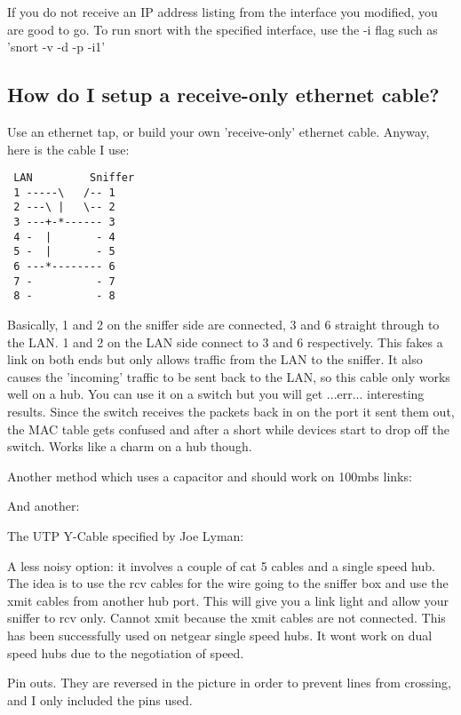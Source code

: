 \documentclass{article}
\begin{document}
If you do not receive an IP address listing from the interface you
modified, you are good to go.  To run snort with the specified interface,
use the -i flag such as 'snort -v -d -p -i1'
 
\subsection{How do I setup a receive-only ethernet cable?}

Use an ethernet tap, or build your own 'receive-only' ethernet cable.
Anyway, here is the cable I use: 

\begin{verbatim}
 LAN         Sniffer 
 1 -----\   /-- 1
 2 ---\ |   \-- 2
 3 ---+-*------ 3
 4 -  |       - 4
 5 -  |       - 5
 6 ---*-------- 6
 7 -          - 7
 8 -          - 8
\end{verbatim}

Basically, 1 and 2 on the sniffer side are connected, 3 and 6 
straight through to the LAN. 1 and 2 on the LAN side connect to 3 and 
6 respectively. This fakes a link on both ends but only allows 
traffic from the LAN to the sniffer. It also causes the 'incoming' 
traffic to be sent back to the LAN, so this cable only works well on 
a hub. You can use it on a switch but you will get ...err... 
interesting results. Since the switch receives the packets back in on 
the port it sent them out, the MAC table gets confused and after a 
short while devices start to drop off the switch. Works like a charm 
on a hub though. 

Another method which uses a capacitor and should work on 100mbs links:


And another:

    The UTP Y-Cable specified by Joe Lyman:

A less noisy option: it involves a couple of cat 5 cables and a single speed
hub. The idea is to use the rcv cables for the wire going to the sniffer box
and use the xmit cables from another hub port. This will give you a link light
and allow your sniffer to rcv only. Cannot xmit because the xmit cables are not
connected. This has been successfully used on netgear single speed hubs. It
wont work on dual speed hubs due to the negotiation of speed.

Pin outs. They are reversed in the picture in order to prevent lines from
crossing, and I only included the pins used.
\end{document}
